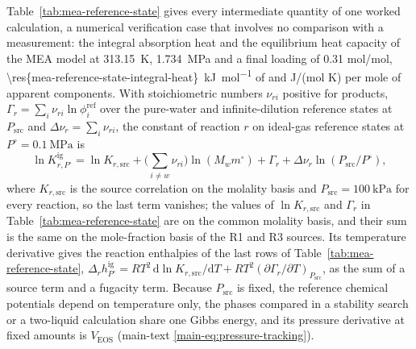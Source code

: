 \documentclass[a4paper,11pt]{article}
\begin{document}
Table~\ref{tab:mea-reference-state} gives every intermediate quantity of one worked calculation, a numerical verification case that involves no comparison with a measurement: the integral absorption heat and the equilibrium heat capacity of the MEA model at \SI{313.15}{\kelvin}, \SI{1.734}{\mega\pascal} and a final loading of 0.31 mol/mol, \SI{\res{mea-reference-state-integral-heat}}{\kilo\joule\per\mole} of \COtwo and  J/(mol K) per mole of apparent components.
With stoichiometric numbers $\nu_{ri}$ positive for products, $\Gamma_r=\sum_i\nu_{ri}\ln\phi_i^{\mathrm{ref}}$ over the pure-water and infinite-dilution reference states at $P_{\mathrm{src}}$ and $\Delta\nu_r=\sum_i\nu_{ri}$, the constant of reaction $r$ on ideal-gas reference states at $P^\circ=\SI{0.1}{\mega\pascal}$ is
\begin{equation}
 \ln K_{r,P^\circ}^{\mathrm{ig}}=\ln K_{r,\mathrm{src}}+\Big(\sum_{i\ne w}\nu_{ri}\Big)\ln(M_wm^\circ)+\Gamma_r+\Delta\nu_r\ln(P_{\mathrm{src}}/P^\circ),
 \label{eq:pressure-standard-conversion}
\end{equation}
where $K_{r,\mathrm{src}}$ is the source correlation on the molality basis and $P_{\mathrm{src}}=\SI{100}{\kilo\pascal}$ for every reaction, so the last term vanishes; the values of $\ln K_{r,\mathrm{src}}$ and $\Gamma_r$ in Table~\ref{tab:mea-reference-state} are on the common molality basis, and their sum is the same on the mole-fraction basis of the R1 and R3 sources.
Its temperature derivative gives the reaction enthalpies of the last rows of Table~\ref{tab:mea-reference-state}, $\Delta_rh_{P^\circ}^{\mathrm{ig}}=RT^2\,\mathrm{d}\ln K_{r,\mathrm{src}}/\mathrm{d}T+RT^2(\partial\Gamma_r/\partial T)_{P_{\mathrm{src}}}$, as the sum of a source term and a fugacity term.
Because $P_{\mathrm{src}}$ is fixed, the reference chemical potentials depend on temperature only, the phases compared in a stability search or a two-liquid calculation share one Gibbs energy, and its pressure derivative at fixed amounts is $V_{\mathrm{EOS}}$ (main-text \cref{main-eq:pressure-tracking}).


\end{document}
